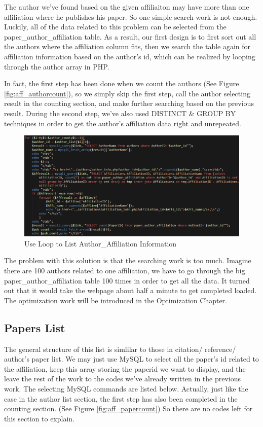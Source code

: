\documentclass{book}
\begin{document}
The author we've found based on the given affiliaiton may have more than one affiliation where he publishes his paper. So one simple search work is not enough. Luckily, all of the data related to this problem can be selected from the paper\_author\_affiliation table. As a result, our first design is to first sort out all the authors where the affiliation column fits, then we search the table again for affiliation information based on the author's id, which can be realized by looping through the author array in PHP.

In fact, the first step has been done when we count the authors (See Figure \ref{fig:aff_authorcount}), so we simply skip the first step, call the author selecting result in the counting section, and make further searching based on the previous result. During the second step, we've also used DISTINCT \& GROUP BY techniques in order to get the author's affiliation data right and unrepeated.

\begin{figure}[H]
\centering
\includegraphics[scale=0.55]{img/zlt_aff_authorloop.png}
\caption{Use Loop to List Author\_Affiliation Information}
\end{figure}

The problem with this solution is that the searching work is too much. Imagine there are 100 authors related to one affiliation, we have to go through the big paper\_author\_affiliation table 100 times in order to get all the data. It turned out that it would take the webpage about half a minute to get completed loaded. The optimization work will be introduced in the Optimization Chapter.

\subsection{Papers List}

The general structure of this list is simlilar to those in citation/ reference/ author's paper list. We may just use MySQL to select all the paper's id related to the affiliation, keep this array storing the paperid we want to display, and the leave the rest of the work to the codes we've already written in the previous work. The selecting MySQL commands are listed below. Actually, just like the case in the author list section, the first step has also been completed in the counting section. (See Figure \ref{fig:aff_papercount}) So there are no codes left for this section to explain.
\end{document}
